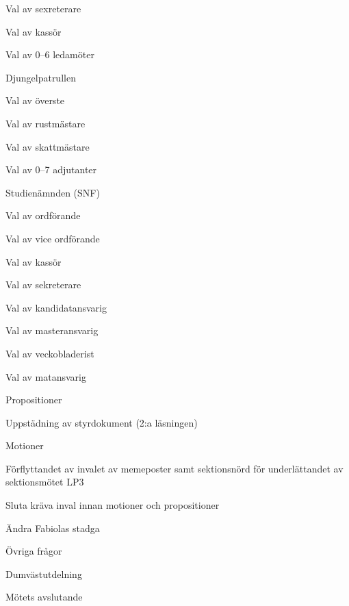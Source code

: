 \documentclass[slutlig]{sektionsmote}
\begin{document}
\begin{ootd}
\begin{ootd}
\begin{ootd}
        \item Val av sexreterare
        \item Val av kassör
        \item Val av 0--6 ledamöter
    \end{ootd}
    \item Djungelpatrullen
    \begin{ootd}
        \item Val av överste
        \item Val av rustmästare
        \item Val av skattmästare
        \item Val av 0--7 adjutanter
    \end{ootd}
    \item Studienämnden (SNF)
    \begin{ootd}
        \item Val av ordförande
        \item Val av vice ordförande
        \item Val av kassör
        \item Val av sekreterare
        \item Val av kandidatansvarig
        \item Val av masteransvarig
        \item Val av veckobladerist
        \item Val av matansvarig
    \end{ootd}
\end{ootd}

\item{Propositioner}
\begin{ootd}
    \item Uppstädning av styrdokument (2:a läsningen)
\end{ootd}

\item{Motioner}
\begin{ootd}
    \item Förflyttandet av invalet av memeposter samt sektionsnörd för underlättandet av sektionsmötet LP3
    \item Sluta kräva inval innan motioner och propositioner
    \item Ändra Fabiolas stadga
\end{ootd}

\item{Övriga frågor}

\item{Dumvästutdelning}

\item{Mötets avslutande}
\end{ootd}
\end{document}
